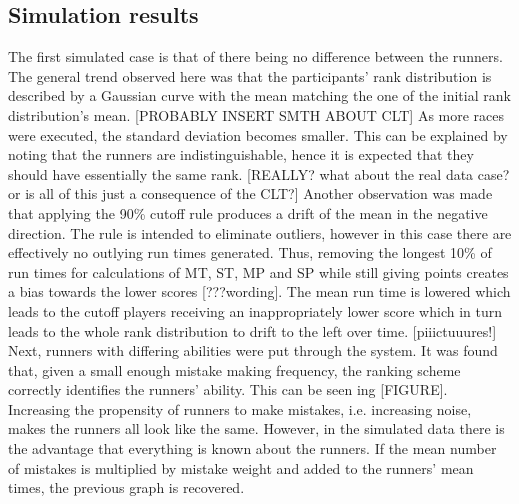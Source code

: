 \subsection{Simulation results}
The first simulated case is that of there being no difference between the runners. The general trend observed here was that the participants' rank distribution is described by a Gaussian curve with the mean matching the one of the initial rank distribution's mean. [PROBABLY INSERT SMTH ABOUT CLT] As more races were executed, the standard deviation becomes smaller. This can be explained by noting that the runners are indistinguishable, hence it is expected that they should have essentially the same rank. [REALLY? what about the real data case? or is all of this just a consequence of the CLT?]
Another observation was made that applying the 90\% cutoff rule produces a drift of the mean in the negative direction. The rule is intended to eliminate outliers, however in this case there are effectively no outlying run times generated. Thus, removing the longest 10\% of run times for calculations of MT, ST, MP and SP while still giving points creates a bias towards the lower scores [???wording]. The mean run time is lowered which leads to the cutoff players receiving an inappropriately lower score which in turn leads to the whole rank distribution to drift to the left over time. 
[piiictuuures!]
Next, runners with differing abilities were put through the system. It was found that, given a small enough mistake making frequency, the ranking scheme correctly identifies the runners' ability. This can be seen ing [FIGURE]. 
Increasing the propensity of runners to make mistakes, i.e. increasing noise, makes the runners all look like the same. However, in the simulated data there is the advantage that everything is known about the runners. If the mean number of mistakes is  multiplied by mistake weight and added to the runners' mean times, the previous graph is recovered. 